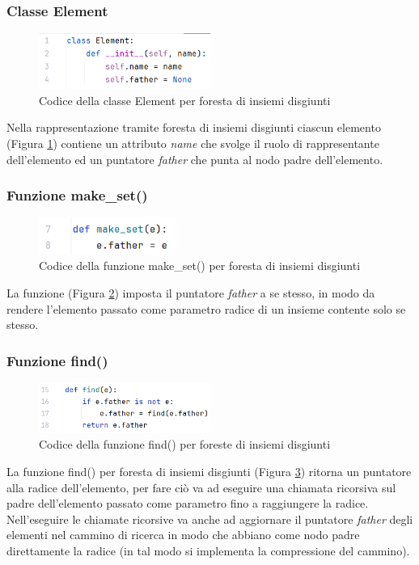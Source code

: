 \documentclass[12pt]{article}
\begin{document}
\subsubsection{Classe Element}
\begin{figure}[h]
    \centering
    \includegraphics[width=0.5\textwidth]{images/set_forest_code_images/sf_element.png}
    \caption{Codice della classe Element per foresta di insiemi disgiunti}
    \label{fig:sf_element}
\end{figure}
Nella rappresentazione tramite foresta di insiemi disgiunti ciascun elemento (Figura \ref{fig:sf_element}) contiene un attributo \textit{name} che svolge il ruolo di rappresentante dell'elemento ed un puntatore \textit{father} che punta al nodo padre dell'elemento.

\subsubsection{Funzione make\_set()}
\begin{figure}[h]
    \centering
    \includegraphics[width=0.4\textwidth]{images/set_forest_code_images/sf_make_set.png}
    \caption{Codice della funzione make\_set() per foresta di insiemi disgiunti}
    \label{fig:sf_make_set}
\end{figure}
La funzione (Figura \ref{fig:sf_make_set}) imposta il puntatore \textit{father} a se stesso, in modo da rendere l'elemento passato come parametro radice di un insieme contente solo se stesso.

\subsubsection{Funzione find()}
\begin{figure}[h]
    \centering
    \includegraphics[width=0.5\textwidth]{images/set_forest_code_images/sf_find.png}
    \caption{Codice della funzione find() per foreste di insiemi disgiunti}
    \label{fig:sf_find}
\end{figure}
La funzione find() per foresta di insiemi disgiunti (Figura \ref{fig:sf_find}) ritorna un puntatore alla radice dell'elemento, per fare ciò va ad eseguire una chiamata ricorsiva sul padre dell'elemento passato come parametro fino a raggiungere la radice.\\
Nell'eseguire le chiamate ricorsive va anche ad aggiornare il puntatore \textit{father} degli elementi nel cammino di ricerca in modo che abbiano come nodo padre direttamente la radice (in tal modo si implementa la compressione del cammino).
\end{document}

